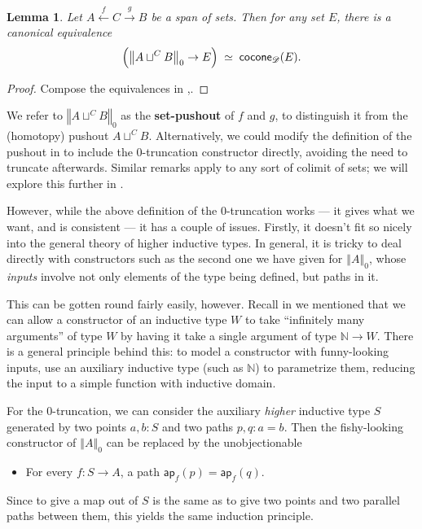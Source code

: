 \documentclass[12pt]{article}
\newcommand{\cocone}[2]{\mathsf{cocone}_{#1}(#2)}
\newcommand{\Ddiag}{\mathscr{D}}
\newcommand{\define}[1]{\textbf{#1}}
\newcommand{\eqvsym}{\simeq}
\newcommand{\indexdef}[1]{\index{#1|defstyle}}
\newcommand{\mapfunc}[1]{\ensuremath{\mathsf{ap}_{#1}}\xspace}
\newcommand{\N}{\ensuremath{\mathbb{N}}\xspace}
\newcommand{\Parens}[1]{\Bigl(#1\Bigr)}
\newcommand{\trunc}[2]{\mathopen{}\left\Vert #2\right\Vert_{#1}\mathclose{}}
\newcounter{mathcount}
\newtheorem{prelem}{Lemma}
\newenvironment{lem}{\begin{prelem}}{\end{prelem}\addtocounter{mathcount}{1}}
\let\apfunc\mapfunc
\let\nat\N
\begin{document}
\begin{lem}\label{thm:set-pushout}
  Let $A \xleftarrow{f} C \xrightarrow{g} B$ be a span of sets.
  Then for any set $E$, there is a canonical equivalence
  \[ \Parens{\trunc0{A\sqcup^C B} \to E} \;\eqvsym\; \cocone{\Ddiag}{E}. \]
\end{lem}
\begin{proof}
  Compose the equivalences in ,.
\end{proof}

We refer to $\trunc0{A\sqcup^C B}$ as the \define{set-pushout}
\indexdef{set-pushout}%
of $f$ and $g$, to distinguish it from the (homotopy) pushout $A\sqcup^C B$.
Alternatively, we could modify the definition of the pushout in  to include the $0$-truncation constructor directly, avoiding the need to truncate afterwards.
Similar remarks apply to any sort of colimit of sets; we will explore this further in .

However, while the above definition of the 0-truncation works --- it gives what we want, and is consistent --- it has a couple of issues.
Firstly, it doesn't fit so nicely into the general theory of higher inductive types.
In general, it is tricky to deal directly with constructors such as the second one we have given for $\trunc0A$, whose \emph{inputs} involve not only elements of the type being defined, but paths in it.

This can be gotten round fairly easily, however.
Recall in  we mentioned that we can allow a constructor of an inductive type $W$ to take ``infinitely many arguments'' of type $W$ by having it take a single argument of type $\nat\to W$.
There is a general principle behind this: to model a constructor with funny-looking inputs, use an auxiliary inductive type (such as \nat) to parametrize them, reducing the input to a simple function with inductive domain.

For the 0-truncation, we can consider the auxiliary \emph{higher} inductive type $S$ generated by two points $a,b:S$ and two paths $p,q:a=b$.
Then the fishy-looking constructor of $\trunc 0A$ can be replaced by the unobjectionable
\begin{itemize}
\item For every $f:S\to A$, a path $\apfunc{f}(p) = \apfunc{f}(q)$.
\end{itemize}
Since to give a map out of $S$ is the same as to give two points and two parallel paths between them, this yields the same induction principle.
\end{document}
